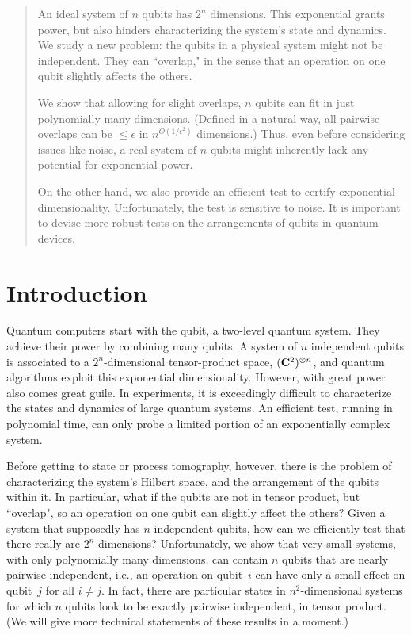 \documentclass[11pt]{article}
\begin{document}
\fi


\begin{abstract}
An ideal system of $n$ qubits has $2^n$ dimensions.  This exponential grants power, but also hinders characterizing the system's state and dynamics.  We study a new problem: the qubits in a physical system might not be independent.  They can ``overlap," in the sense that an operation on one qubit slightly affects the others.  

We show that allowing for slight overlaps, $n$ qubits can fit in just polynomially many dimensions.  (Defined in a natural way, all pairwise overlaps can be $\leq \epsilon$ in $n^{O(1/\epsilon^2)}$ dimensions.)  Thus, even before considering issues like noise, a real system of $n$ qubits might inherently lack any potential for exponential power.  

On the other hand, we also provide an efficient test to certify exponential dimensionality.  Unfortunately, the test is sensitive to noise.  It is important to devise more robust tests on the arrangements of qubits in quantum devices.  
\end{abstract}


\section{Introduction}

Quantum computers start with the qubit, a two-level quantum system.  They achieve their power by combining many qubits.  A system of $n$ independent qubits is associated to a $2^n$-dimensional tensor-product space, $({\bf C}^2)^{\otimes n}$, and quantum algorithms exploit this exponential dimensionality.  However, with great power also comes great guile.  In experiments, it is exceedingly difficult to characterize the states and dynamics of large quantum systems.  An efficient test, running in polynomial time, can only probe a limited portion of an exponentially complex system.  

Before getting to state or process tomography, however, there is the problem of characterizing the system's Hilbert space, and the arrangement of the qubits within it.  In particular, what if the qubits are not in tensor product, but ``overlap", so an operation on one qubit can slightly affect the others?  Given a system that supposedly has $n$ independent qubits, how can we efficiently test that there really are $2^n$ dimensions?  Unfortunately, we show that very small systems, with only polynomially many dimensions, can contain $n$ qubits that are nearly pairwise independent, i.e., an operation on qubit~$i$ can have only a small effect on qubit~$j$ for all $i \neq j$.  In fact, there are particular states in $n^2$-dimensional systems for which $n$ qubits look to be exactly pairwise independent, in tensor product.  (We will give more technical statements of these results in a moment.)  
\end{document}
